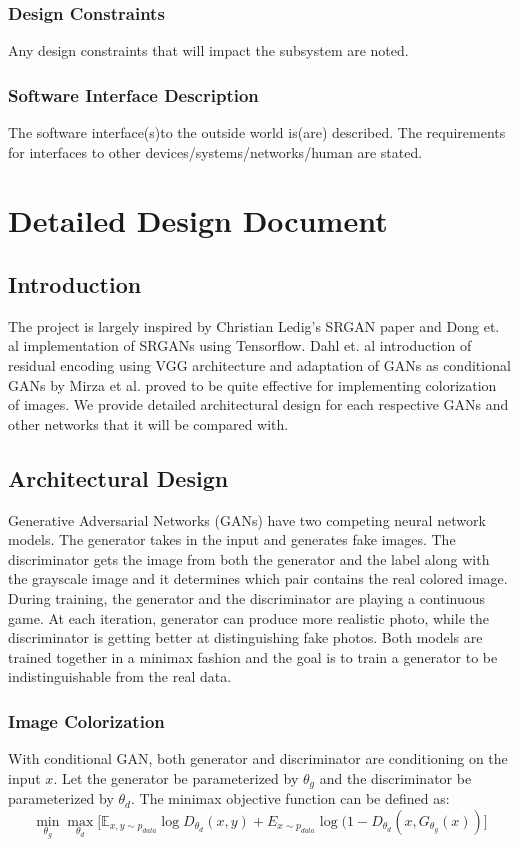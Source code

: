 \documentclass[oneside,a4paper,12pt]{report}
\begin{document}
 \subsection{Design Constraints}
Any design constraints that will impact the subsystem are noted.
 \subsection{Software Interface Description}
The software interface(s)to the outside world is(are) described.
The requirements for interfaces to other devices/systems/networks/human are stated.



\chapter{Detailed Design Document }
 \section{Introduction}
The project is largely inspired by Christian Ledig's SRGAN paper \cite{ledig2017photorealistic} and Dong et. al \cite{dong2014super} implementation of SRGANs using Tensorflow. Dahl et. al \cite{dahl2016automatic} introduction of residual encoding using VGG architecture and adaptation of GANs as conditional GANs by Mirza et al. \cite{mirza2014conditional} proved to be quite effective for implementing colorization of images. We provide detailed architectural design for each respective GANs and other networks that it will be compared with. 
\section{Architectural Design}
	Generative Adversarial Networks (GANs) have two competing neural network models. The generator takes in the input and generates fake images. The discriminator gets the image from both the generator and the label along with the grayscale image and it determines which pair contains the real colored image. During training, the generator and the discriminator are playing a continuous game. At each iteration, generator can produce more realistic photo, while the discriminator is getting better at distinguishing fake photos. Both models are trained together in a minimax fashion and the goal is to train a generator to be indistinguishable from the real data. 
	\subsection{Image Colorization}	
	\hspace{0.4 in}With conditional GAN, both generator and discriminator are conditioning on the input $x$. Let the generator be parameterized by $\theta_g$ and the discriminator be parameterized by $\theta_d$. The minimax objective function can be defined as:
	\[
		\min_{\theta_g}\max_{\theta_d}\Big[\mathbb{E}_{x,y\sim p_{data}} \log D_{\theta_d}(x,y) + E_{x\sim p_{data}} \log(1 - D_{\theta_d}(x, G_{\theta_g}(x))\Big]
	\]
	
\end{document}
